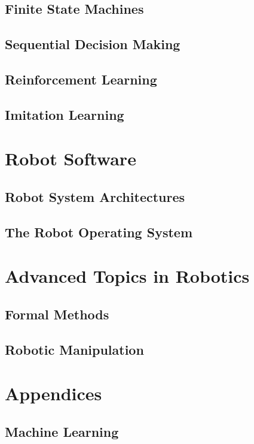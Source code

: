 \documentclass[nohyper,nobib]{tufte-book}
\begin{document}
\chapter{Finite State Machines}

\chapter{Sequential Decision Making}

\chapter{Reinforcement Learning}

\chapter{Imitation Learning}


\part{Robot Software}
\chapter{Robot System Architectures}

\chapter{The Robot Operating System}


\part{Advanced Topics in Robotics}
\chapter{Formal Methods}

\chapter{Robotic Manipulation}


\appendix
\part{Appendices}
\chapter{Machine Learning}


\printbibliography
\end{document}
